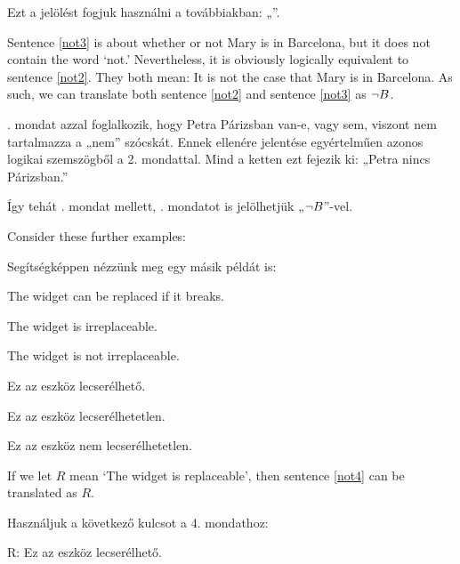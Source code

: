 Ezt a jelölést fogjuk használni a továbbiakban: „\enot”.

Sentence \ref{not3} is about whether or not Mary is in Barcelona, but it does not contain the word `not.' Nevertheless, it is obviously logically equivalent to sentence \ref{not2}. They both mean: It is not the case that Mary is in Barcelona. As such, we can translate both sentence \ref{not2} and sentence \ref{not3} as $\neg B$.

. mondat azzal foglalkozik, hogy Petra Párizsban van-e, vagy sem, viszont nem tartalmazza a „nem” szócskát. Ennek ellenére jelentése egyértelműen azonos logikai szemszögből a 2. mondattal. Mind a ketten ezt fejezik ki: „Petra nincs Párizsban.”

Így tehát . mondat mellett, . mondatot is jelölhetjük „$\neg B$”-vel.



Consider these further examples:

Segítségképpen nézzünk meg egy másik példát is:

\begin{earg}
\item[\ex{not4}] The widget can be replaced if it breaks.
\item[\ex{not5}] The widget is irreplaceable.
\item[\ex{not5b}] The widget is not irreplaceable.
\end{earg}

\begin{earg}
\item[\ex{not4}] Ez az eszköz lecserélhető.
\item[\ex{not5}] Ez az eszköz lecserélhetetlen.
\item[\ex{not5b}] Ez az eszköz nem lecserélhetetlen.
\end{earg}


If we let $R$ mean `The widget is replaceable', then sentence \ref{not4} can be translated as $R$.

Használjuk a következő kulcsot a 4. mondathoz:

\begin{ekey}
\item[R:]Ez az eszköz lecserélhető.
\end{ekey}

